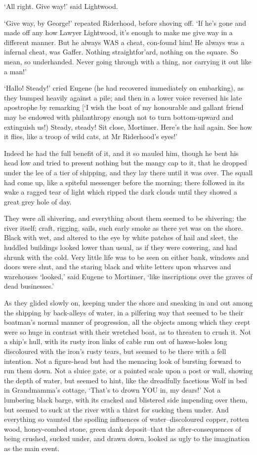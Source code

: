 ‘All right. Give way!’ said Lightwood.

‘Give way, by George!’ repeated Riderhood, before shoving off. ‘If he’s
gone and made off any how Lawyer Lightwood, it’s enough to make me give
way in a different manner. But he always WAS a cheat, con-found him!
He always was a infernal cheat, was Gaffer. Nothing straightfor’ard,
nothing on the square. So mean, so underhanded. Never going through with
a thing, nor carrying it out like a man!’

‘Hallo! Steady!’ cried Eugene (he had recovered immediately on
embarking), as they bumped heavily against a pile; and then in a lower
voice reversed his late apostrophe by remarking [‘I wish the boat of my
honourable and gallant friend may be endowed with philanthropy enough
not to turn bottom-upward and extinguish us!) Steady, steady! Sit close,
Mortimer. Here’s the hail again. See how it flies, like a troop of wild
cats, at Mr Riderhood’s eyes!’

Indeed he had the full benefit of it, and it so mauled him, though he
bent his head low and tried to present nothing but the mangy cap to it,
that he dropped under the lee of a tier of shipping, and they lay there
until it was over. The squall had come up, like a spiteful messenger
before the morning; there followed in its wake a ragged tear of light
which ripped the dark clouds until they showed a great grey hole of day.

They were all shivering, and everything about them seemed to be
shivering; the river itself; craft, rigging, sails, such early smoke as
there yet was on the shore. Black with wet, and altered to the eye by
white patches of hail and sleet, the huddled buildings looked lower
than usual, as if they were cowering, and had shrunk with the cold. Very
little life was to be seen on either bank, windows and doors were shut,
and the staring black and white letters upon wharves and warehouses
‘looked,’ said Eugene to Mortimer, ‘like inscriptions over the graves of
dead businesses.’

As they glided slowly on, keeping under the shore and sneaking in and
out among the shipping by back-alleys of water, in a pilfering way
that seemed to be their boatman’s normal manner of progression, all
the objects among which they crept were so huge in contrast with their
wretched boat, as to threaten to crush it. Not a ship’s hull, with its
rusty iron links of cable run out of hawse-holes long discoloured with
the iron’s rusty tears, but seemed to be there with a fell intention.
Not a figure-head but had the menacing look of bursting forward to run
them down. Not a sluice gate, or a painted scale upon a post or wall,
showing the depth of water, but seemed to hint, like the dreadfully
facetious Wolf in bed in Grandmamma’s cottage, ‘That’s to drown YOU in,
my dears!’ Not a lumbering black barge, with its cracked and blistered
side impending over them, but seemed to suck at the river with a
thirst for sucking them under. And everything so vaunted the spoiling
influences of water--discoloured copper, rotten wood, honey-combed
stone, green dank deposit--that the after-consequences of being crushed,
sucked under, and drawn down, looked as ugly to the imagination as the
main event.

